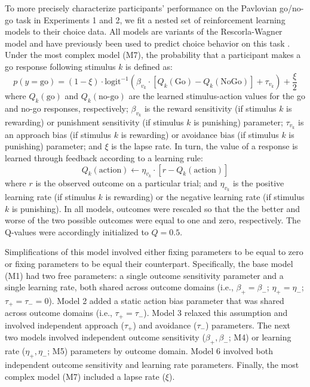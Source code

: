 \documentclass[a4paper,12pt]{article}
\begin{document}
\begin{refsection}[supp]
To more precisely characterize participants' performance on the Pavlovian go/no-go task in Experiments 1 and 2, we fit a nested set of reinforcement learning models to their choice data.  All models are variants of the Rescorla-Wagner model and have previously been used to predict choice behavior on this task \cite{guitart2012go, mkrtchian2017modeling, moutoussis2018change, swart2017catecholaminergic}. Under the most complex model (M7), the probability that a participant makes a go response following stimulus $k$ is defined as:
\begin{equation}
    p(y = \text{go}) = (1 - \xi) \cdot \text{logit}^{-1} \left( \beta_{v_k} \cdot [Q_k(\text{Go}) - Q_k(\text{NoGo})] + \tau_{v_k} \right) + \frac{\xi}{2}
\end{equation}
where $Q_k(\text{go})$ and $Q_k(\text{no-go})$ are the learned stimulus-action values for the go and no-go responses, respectively; $\beta_{v_k}$ is the reward sensitivity (if stimulus $k$ is rewarding) or punishment sensitivity (if stimulus $k$ is punishing) parameter; $\tau_{v_k}$ is an approach bias (if stimulus $k$ is rewarding) or avoidance bias (if stimulus $k$ is punishing) parameter; and $\xi$ is the lapse rate. In turn, the value of a response is learned through feedback according to a learning rule:
\begin{equation}
    Q_k(\text{action}) \leftarrow \eta_{v_k} \cdot \left[ r - Q_k(\text{action}) \right]
\end{equation}
where $r$ is the observed outcome on a particular trial; and $\eta_{v_k}$ is the positive learning rate (if stimulus $k$ is rewarding) or the negative learning rate (if stimulus $k$ is punishing). In all models, outcomes were rescaled so that the the better and worse of the two possible outcomes were equal to one and zero, respectively. The Q-values were accordingly initialized to $Q = 0.5$. 

Simplifications of this model involved either fixing parameters to be equal to zero or fixing parameters to be equal their counterpart. Specifically, the base model (M1) had two free parameters: a single outcome sensitivity parameter and a single learning rate, both shared across outcome domains (i.e., $\beta_+ = \beta_-$; $\eta_+ = \eta_-$; $\tau_+ = \tau_- = 0$). Model 2 added a static action bias parameter that was shared across outcome domains (i.e., $\tau_+ = \tau_-$). Model 3 relaxed this assumption and involved independent approach ($\tau_+$) and avoidance ($\tau_-$) parameters. The next two models involved independent outcome sensitivity ($\beta_+, \beta_-$; M4) or learning rate ($\eta_+, \eta_-$; M5) parameters by outcome domain. Model 6 involved both independent outcome sensitivity and learning rate parameters. Finally, the most complex model (M7) included a lapse rate ($\xi$).


\end{refsection}
\end{document}

